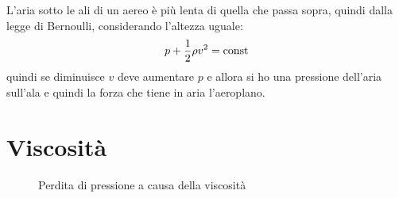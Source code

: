 \begin{Es}
L'aria sotto le ali di un aereo è più lenta di quella che passa sopra, quindi dalla legge di Bernoulli, considerando l'altezza uguale:
$$p+\frac{1}{2}\rho v^2=\text{const}$$
quindi se diminuisce $v$ deve aumentare $p$ e allora si ho una pressione dell'aria sull'ala e quindi la forza che tiene in aria l'aeroplano.
\end{Es}
\section{Viscosità}
\label{viscosita fisica1}
\begin{figure}[htbp]
\centering
{}\quad
{}
\caption{Perdita di pressione a causa della viscosità}
\end{figure}

